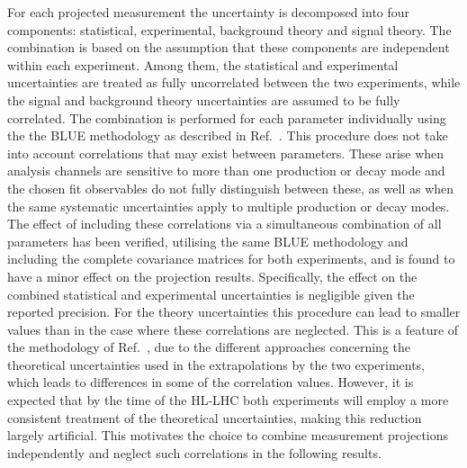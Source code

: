 For each projected measurement the uncertainty is decomposed into four components: statistical, experimental, background theory and signal theory.
The combination is based on the assumption that these components are independent within each experiment. Among them, the statistical and experimental uncertainties are treated as fully uncorrelated between the two experiments, while the signal and background theory uncertainties are assumed to be fully correlated. The combination is performed for each parameter individually using the the BLUE methodology as described in Ref.~\cite{Valassi:2003mu}. This procedure does not take into account correlations that may exist between parameters. These arise when analysis channels are sensitive to more than one production or decay mode and the chosen fit observables do not fully distinguish between these, as well as when the same systematic uncertainties apply to multiple production or decay modes. The effect of including these correlations via a simultaneous combination of all parameters has been verified, utilising the same BLUE methodology and including the complete covariance matrices for both experiments, and is found to have a minor effect on the projection results. Specifically, the effect on the combined statistical and experimental uncertainties is negligible given the reported precision. For the theory uncertainties this procedure can lead to smaller values than in the case where these correlations are neglected. This is a feature of the methodology of Ref.~\cite{Valassi:2003mu}, due to the different approaches concerning the theoretical uncertainties used in the extrapolations by the two experiments, which leads to differences in some of the correlation values. However, it is expected that by the time of the HL-LHC both experiments will employ a more consistent treatment of the theoretical uncertainties, making this reduction largely artificial. This motivates the choice to combine measurement projections independently and neglect such correlations in the following results.



